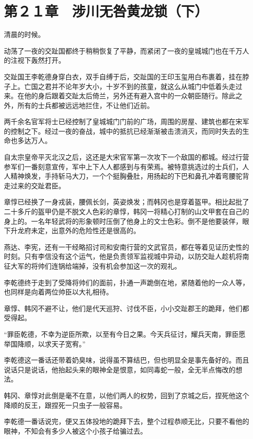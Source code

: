 \section{第２１章　涉川无咎黄龙锁（下）}

清晨的时候。

动荡了一夜的交趾国都终于稍稍恢复了平静，而紧闭了一夜的皇城城门也在千万人的注视下轰然打开。

交趾国王李乾德身穿白衣，双手自缚于后，交趾国的王印玉玺用白布裹着，挂在脖子上。亡国之君并不论年岁大小，十岁不到的孩童，就这么从城门中低着头走过来。在他的身后跟着交趾太后倚兰，另外还有避入宫中的一众朝臣随行。除此之外，所有的士兵都被远远地拦住，不让他们近前。

两千余名官军将士已经控制了皇城城门门前的广场，周围的房屋、建筑也都在宋军的控制之下。经过一夜的奋战，城中的抵抗已经渐渐被击溃消灭，而同时失去的生命也多达万人。

自太宗皇帝平灭北汉之后，这还是大宋官军第一次攻下一个敌国的都城。经过行营参军们一番刻意宣传，军中上下人人都感到与有荣焉。被特意挑选过的士兵们，人人精神焕发，手持斩马大刀，一个个挺胸叠肚，用扬起的下巴和鼻孔冲着弯腰驼背走过来的交趾君臣。

章惇已经换了一身戎装，腰佩长剑，英姿焕发；而韩冈也是穿着盔甲。相比起批了二十多斤的盔甲仍是不脱文人色彩的章惇，韩冈一将精心打制的山文甲套在自己的身上的。一名年轻武将的形象顿时压倒了他身上的文士色彩。倒不是他要装佯，眼下升龙府未定，出意外的危险性还是很高的。

燕达、李宪，还有一干经略招讨司和安南行营的文武官员，都在等着见证历史性的时刻。只有李信没有这个运气，他是负责领军监视城中异动，以防交趾人趁机将南征大军的将帅们连锅给端掉，没有机会参加这一次的观礼。

李乾德终于走到了受降将帅们的面前，扑通一声跪倒在地，紧随着他的一众人等，也同样是向着两位帅臣以大礼相待。

章惇、韩冈不避不让，他们是代天巡狩、讨伐不臣，小小交趾郡王的跪拜，他们都受得起。

“罪臣乾德，不幸为逆臣所欺，以至有今日之果。今天兵征讨，耀兵天南，罪臣愿举国降顺，以求天子宽宥。”

李乾德这一番话还带着奶臭味，说得虽不算结巴，但也明显全是事先备好的。而且说话只是说话，他抬起头来的眼神全是恨意，如同毒蛇一般，全无半点悔改的想法。

韩冈、章惇对此倒是毫不在意，以他们两人的权势，回到了京城之后，捏死他这个降顺的反王，跟捏死一只虫子一般容易。

李乾德一番话说完，便又五体投地的跪拜下去，整个过程恭顺无比，只要不看他的眼神，不知会有多少人被这个小孩子给骗过去。

